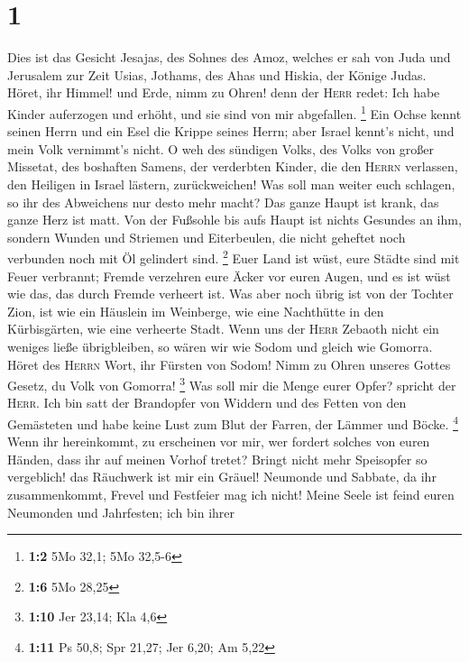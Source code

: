 \hypertarget{section}{%
\section{1}\label{section}}

 Dies ist das Gesicht Jesajas, des Sohnes des Amoz,
welches er sah von Juda und Jerusalem zur Zeit Usias, Jothams, des Ahas
und Hiskia, der Könige Judas.  Höret, ihr Himmel! und
Erde, nimm zu Ohren! denn der \textsc{Herr} redet: Ich habe Kinder
auferzogen und erhöht, und sie sind von mir abgefallen. \footnote{\textbf{1:2}
  5Mo 32,1; 5Mo 32,5-6}  Ein Ochse kennt seinen Herrn und
ein Esel die Krippe seines Herrn; aber Israel kennt's nicht, und mein
Volk vernimmt's nicht.  O weh des sündigen Volks, des
Volks von großer Missetat, des boshaften Samens, der verderbten Kinder,
die den \textsc{Herrn} verlassen, den Heiligen in Israel lästern,
zurückweichen!  Was soll man weiter euch schlagen, so ihr
des Abweichens nur desto mehr macht? Das ganze Haupt ist krank, das
ganze Herz ist matt.  Von der Fußsohle bis aufs Haupt ist
nichts Gesundes an ihm, sondern Wunden und Striemen und Eiterbeulen, die
nicht geheftet noch verbunden noch mit Öl gelindert sind. \footnote{\textbf{1:6}
  5Mo 28,25}  Euer Land ist wüst, eure Städte sind mit
Feuer verbrannt; Fremde verzehren eure Äcker vor euren Augen, und es ist
wüst wie das, das durch Fremde verheert ist.  Was aber
noch übrig ist von der Tochter Zion, ist wie ein Häuslein im Weinberge,
wie eine Nachthütte in den Kürbisgärten, wie eine verheerte Stadt.
 Wenn uns der \textsc{Herr} Zebaoth nicht ein weniges
ließe übrigbleiben, so wären wir wie Sodom und gleich wie Gomorra.
 Höret des \textsc{Herrn} Wort, ihr Fürsten von Sodom!
Nimm zu Ohren unseres Gottes Gesetz, du Volk von Gomorra! \footnote{\textbf{1:10}
  Jer 23,14; Kla 4,6}  Was soll mir die Menge eurer
Opfer? spricht der \textsc{Herr}. Ich bin satt der Brandopfer von
Widdern und des Fetten von den Gemästeten und habe keine Lust zum Blut
der Farren, der Lämmer und Böcke. \footnote{\textbf{1:11} Ps 50,8; Spr
  21,27; Jer 6,20; Am 5,22}  Wenn ihr hereinkommt, zu
erscheinen vor mir, wer fordert solches von euren Händen, dass ihr auf
meinen Vorhof tretet?  Bringt nicht mehr Speisopfer so
vergeblich! das Räuchwerk ist mir ein Gräuel! Neumonde und Sabbate, da
ihr zusammenkommt, Frevel und Festfeier mag ich nicht! 
Meine Seele ist feind euren Neumonden und Jahrfesten; ich bin ihrer

